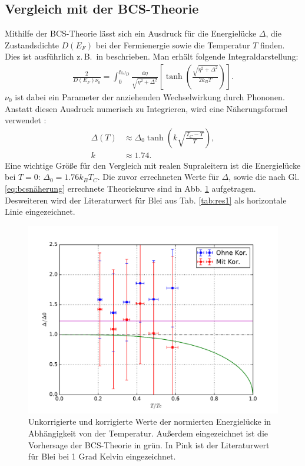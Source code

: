 \documentclass[twoside,        %
               BCOR12mm,       %
               english,ngerman, %
               fleqn,headsepline=false,footsepline=false
              ]{Vorlage/MFPREPORT}
\renewcommand{\d}{\ensuremath{\mathrm{d}}} %
\newcommand{\zB}{z.\,B.\ }
\begin{document}
\subsection{Vergleich mit der BCS-Theorie}
Mithilfe der BCS-Theorie lässt sich ein Ausdruck für die Energielücke $\Delta$,
die Zustandsdichte $D(E_F)$ bei der Fermienergie sowie die Temperatur $T$
finden. Dies ist ausführlich \zB in \cite{enss2011tieftemperaturphysik}
beschrieben. Man erhält folgende Integraldarstellung:
\begin{align}
    \label{eq:bcsint}
    \frac{2}{D(E_F)\nu_0}=\int_0^{\hbar \omega_D}\frac{\d
    \eta}{\sqrt{\eta^2+\Delta^2}}\left[
    \tanh\left({\frac{\sqrt{\eta^2+\Delta^2}}{2k_BT}}\right) \right].
\end{align}
$\nu_0$ ist dabei ein Parameter der anziehenden Wechselwirkung durch Phononen.
Anstatt diesen Ausdruck numerisch zu Integrieren, wird eine Näherungsformel
verwendet \cite{senapati2011spin}:
\begin{align}
    \label{eq:bcsnäherung}
    \Delta(T)&\approx\Delta_0\tanh\left(k\sqrt{\frac{T_C-T}{T}}\right),\\
    k&\approx1.74.
\end{align}
Eine wichtige Größe für den Vergleich mit realen Supraleitern ist die
Energielücke bei $T=0$: $\Delta_0=1.76k_BT_C$.
Die zuvor errechneten Werte für $\Delta$, sowie die nach Gl.
\ref{eq:bcsnäherung} errechnete Theoriekurve sind in Abb. \ref{fig:4}
aufgetragen. Desweiteren wird der Literaturwert für Blei aus Tab.
\ref{tab:res1} als horizontale Linie eingezeichnet.

\begin{figure}[]
    \centering
    \includegraphics[width=\textwidth]{fig/4.pdf}
    \caption{Unkorrigierte und korrigierte Werte der normierten Energielücke in
    Abhängigkeit von der Temperatur. Außerdem eingezeichnet ist die Vorhersage
    der BCS-Theorie in grün. In Pink ist der Literaturwert für Blei bei 1 Grad
    Kelvin eingezeichnet.}
    \label{fig:4}
\end{figure}
\end{document}
